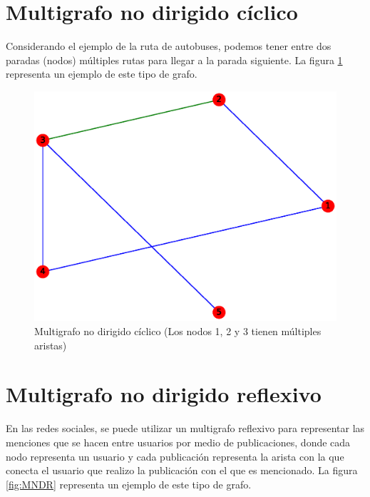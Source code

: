 \documentclass{article}
\begin{document}
\section{Multigrafo no dirigido cíclico}
Considerando el ejemplo de la ruta de autobuses, podemos tener entre dos paradas (nodos) múltiples rutas para llegar a la parada siguiente. La figura \ref{fig:MNDC} representa un ejemplo de este tipo de grafo.
\begin{figure}[h!]
    \includegraphics[width=\textwidth]{8-MNDC}
    \caption{Multigrafo no dirigido cíclico (Los nodos 1, 2 y 3 tienen múltiples aristas)}
    \label{fig:MNDC}
\end{figure}



\section{Multigrafo no dirigido reflexivo}
En las redes sociales, se puede utilizar un multigrafo reflexivo para representar las menciones que se hacen entre usuarios por medio de publicaciones, donde cada nodo representa un usuario y cada publicación representa la arista con la que conecta el usuario que realizo la publicación con el que es mencionado. La figura \ref{fig:MNDR} representa un ejemplo de este tipo de grafo.
\end{document}
